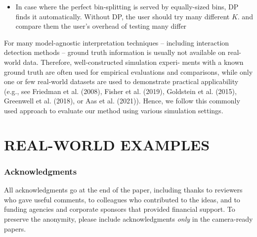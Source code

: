 \documentclass[twoside]{article}
\begin{document}
\begin{itemize}
\item In case where the perfect bin-splitting is served by
  equally-sized bins, DP finds it automatically. Without DP, the user
  should try many different \(K\). and compare them the user's overhead of
  testing many differ
\end{itemize}

For many model-agnostic interpretation techniques
– including interaction detection methods – ground
truth information is usually not available on real-world
data. Therefore, well-constructed simulation experi-
ments with a known ground truth are often used for
empirical evaluations and comparisons, while only one
or few real-world datasets are used to demonstrate
practical applicability (e.g., see Friedman et al. (2008),
Fisher et al. (2019), Goldstein et al. (2015), Greenwell
et al. (2018), or Aas et al. (2021)). Hence, we follow
this commonly used approach to evaluate our method
using various simulation settings.

\section{REAL-WORLD EXAMPLES}


\subsubsection*{Acknowledgments}
All acknowledgments go at the end of the paper, including thanks to reviewers who gave useful comments, to colleagues who contributed to the ideas, and to funding agencies and corporate sponsors that provided financial support. 
To preserve the anonymity, please include acknowledgments \emph{only} in the camera-ready papers.


\end{document}
